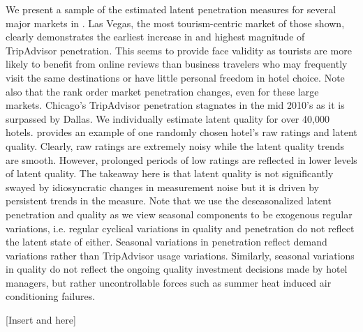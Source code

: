 \documentclass[12pt, leqno]{article}
\begin{document}

We present a sample of the estimated latent penetration measures for several major markets in . Las Vegas, the most tourism-centric market of those shown, clearly demonstrates the earliest increase in and highest magnitude of TripAdvisor penetration. This seems to provide face validity as tourists are more likely to benefit from online reviews than business travelers who may frequently visit the same destinations or have little personal freedom in hotel choice. Note also that the rank order market penetration changes, even for these large markets. Chicago's TripAdvisor penetration stagnates in the mid 2010's as it is surpassed by Dallas. We individually estimate latent quality for over 40,000 hotels.  provides an example of one randomly chosen hotel's raw ratings and latent quality. Clearly, raw ratings are extremely noisy while the latent quality trends are smooth. However, prolonged periods of low ratings are reflected in lower levels of latent quality. The takeaway here is that latent quality is not significantly swayed by idiosyncratic changes in measurement noise but it is driven by persistent trends in the measure. Note that we use the deseasonalized latent penetration and quality as we view seasonal components to be exogenous regular variations, i.e. regular cyclical variations in quality and penetration do not reflect the latent state of either. Seasonal variations in penetration reflect demand variations rather than TripAdvisor usage variations. Similarly, seasonal variations in quality do not reflect the ongoing quality investment decisions made by hotel managers, but rather uncontrollable forces such as summer heat induced air conditioning failures.

[Insert  and  here]


\end{document}
